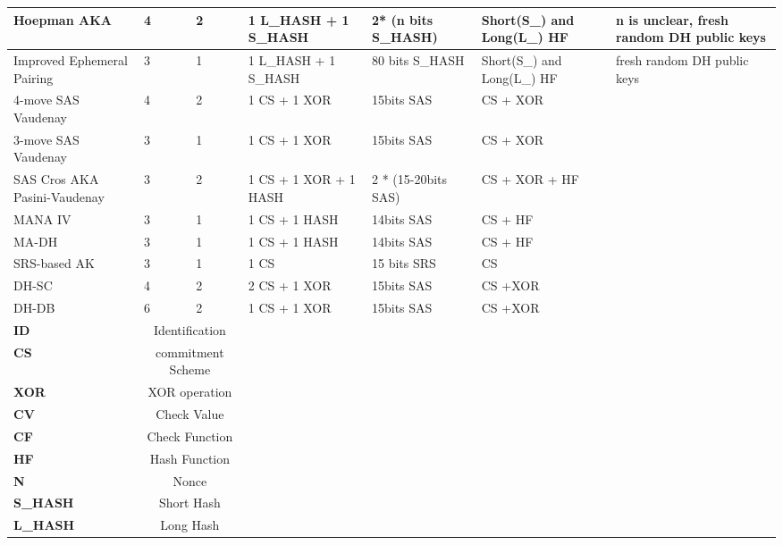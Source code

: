 \begin{table}[ht]
{\begin{tabular}{ | p{2cm} | p{1.4cm} | p{1.4cm} | p{2cm} | p{2.2cm} | p{2cm} | p{2cm}| }
Hoepman AKA & 4	& 2 &	 1 L\_HASH + 1 S\_HASH & 	2* (n bits S\_HASH) &	 Short(S\_) and Long(L\_) HF & n is unclear, fresh random DH public keys \\ \hline 

Improved	Ephemeral Pairing & 3 &	 1 &	 1 L\_HASH + 1 S\_HASH &	80 bits S\_HASH & Short(S\_) and Long(L\_) HF & fresh random DH public keys \\ \hline 
 
4-move SAS Vaudenay & 4	& 2 & 1 CS + 1 XOR & 15bits SAS	& CS + XOR & \\ \hline 

3-move SAS Vaudenay & 3	& 1 & 1 CS + 1 XOR & 15bits SAS	& CS + XOR & \\ \hline 
 																				
SAS Cros AKA Pasini-Vaudenay &	3 &	2 &	1 CS + 1 XOR + 1 HASH & 2 * (15-20bits SAS) & CS + XOR + HF & \\ \hline 

MANA IV & 3 & 1 & 1 CS + 1 HASH & 14bits SAS & CS + HF & \\ \hline 

MA-DH & 3 &	1 &	1 CS + 1 HASH & 14bits SAS & CS + HF & \\ \hline 

 SRS-based AK & 3 & 1 &	1 CS &	 15 bits SRS &	 CS & \\ \hline 

DH-SC & 4 &	2 &	2 CS + 1 XOR & 15bits SAS & CS +XOR & \\ \hline 

DH-DB & 6 &	2 &	1 CS + 1 XOR & 15bits SAS & CS +XOR & \\ \hline \hline 

\textbf{ID} &\multicolumn{2}{c}{Identification} & & & & \\
\textbf{CS} &\multicolumn{2}{c}{commitment Scheme} & & & & \\
\textbf{XOR} &\multicolumn{2}{c}{XOR operation} & & & & \\
\textbf{CV} &\multicolumn{2}{c}{Check Value} & & & & \\
\textbf{CF} &\multicolumn{2}{c}{Check Function} & & & & \\
\textbf{HF} &\multicolumn{2}{c}{Hash Function} & & & & \\
\textbf{N} &\multicolumn{2}{c}{Nonce} & & & & \\
\textbf{S\_HASH} &\multicolumn{2}{c}{Short Hash} & & & & \\
\textbf{L\_HASH} &\multicolumn{2}{c}{Long Hash} & & & & \\ \hline
\end{tabular}
}
\end{table}

